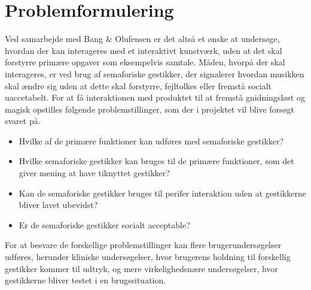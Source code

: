 \section{Problemformulering}
\label{Problemformulering}

Ved samarbejde med Bang $\&$ Olufensen er det altså et ønske at undersøge, hvordan der kan interageres med et interaktivt kunstværk, uden at det skal forstyrre primære opgaver som eksempelvis samtale. Måden, hvorpå der skal interageres, er ved brug af semaforiske gestikker, der signalerer hvordan musikken skal ændre sig uden at dette skal forstyrre, fejltolkes eller fremstå socialt uaccetabelt. For at få interaktionen med produktet til at fremstå gnidningsløst og magisk opstilles følgende problemstillinger, som der i projektet vil blive forsøgt svaret på.\\

\begin{itemize}
	\item Hvilke af de primære funktioner kan udføres med semaforiske gestikker?
	\item Hvilke semaforiske gestikker kan bruges til de primære funktioner, som det giver mening at have tiknyttet gestikker?
	\item Kan de semaforiske gestikker bruges til perifer interaktion uden at gestikkerne bliver lavet ubevidst?
	\item Er de semaforiske gestikker socialt acceptable?\\
\end{itemize}
For at besvare de forskellige problemstillinger kan flere brugerundersøgelser udføres, herunder kliniske undersøgelser, hvor brugerens holdning til forskellig gestikker kommer til udtryk, og mere virkelighedsnære undersøgelser, hvor gestikkerne bliver testet i en brugssituation.